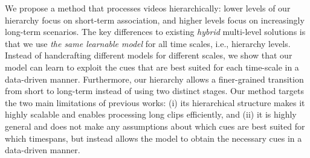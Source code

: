 \documentclass[10pt,twocolumn,letterpaper]{article}
\begin{document}
We propose a method that processes videos hierarchically: lower levels of our hierarchy focus on short-term association, and higher levels focus on increasingly long-term scenarios. 
The key differences to existing \textit{hybrid} multi-level solutions is that we use \textit{the same learnable model} for all time scales, i.e., hierarchy levels. 
Instead of handcrafting different models for different scales, we show that our model can learn to exploit the cues that are best suited for each time-scale in a data-driven manner.
Furthermore, our hierarchy allows a finer-grained transition from short to long-term instead of using two distinct stages. Our method targets the two main limitations of previous works: (i) its hierarchical structure makes it highly scalable and enables processing long clips efficiently, and (ii) it is highly general and does not make any assumptions about which cues are best suited for which timespans, but instead allows the model to obtain the necessary cues in a data-driven manner. 
\end{document}
